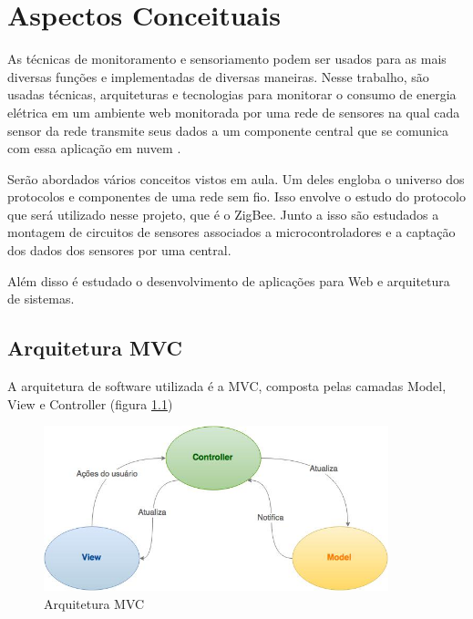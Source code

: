 \chapter{Aspectos Conceituais}
\label{Cap:conceitos}

As técnicas de monitoramento e sensoriamento podem ser usados para as mais diversas funções e implementadas de diversas maneiras. Nesse trabalho, são usadas técnicas, arquiteturas e tecnologias para monitorar o consumo de energia elétrica em um ambiente web monitorada por uma rede de sensores na qual cada sensor da rede transmite seus dados a um componente central que se comunica com essa aplicação em nuvem \citet{low_cost_wireless_sensor_network_SMF_master_thesis} .

Serão abordados vários conceitos vistos em aula. Um deles engloba o universo dos protocolos e componentes de uma rede sem fio. Isso envolve o estudo do protocolo que será utilizado nesse projeto, que é o ZigBee. Junto a isso são estudados a montagem de circuitos de sensores associados a microcontroladores e a captação dos dados dos sensores por uma central.

Além disso é estudado o desenvolvimento de aplicações para Web e arquitetura de sistemas.




\section{Arquitetura MVC }
\label{Sec:MVC}

A arquitetura de software utilizada é a MVC, composta pelas camadas Model, View e Controller (figura \ref{fig:mvc})\\
\begin{figure}
\centering
\includegraphics[width=10cm,keepaspectratio]{figuras/MVC.jpg}
\caption{\label{fig:mvc} Arquitetura MVC}
\end{figure}

